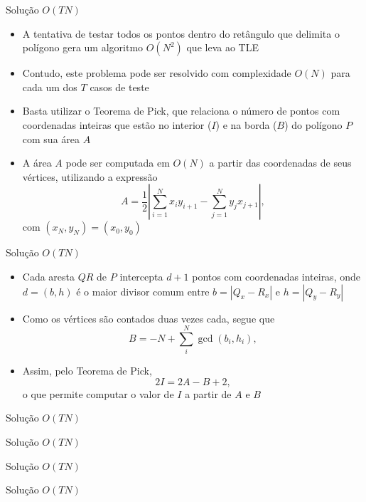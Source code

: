 \begin{frame}[fragile]{Solução $O(TN)$}

    \begin{itemize}
        \item A tentativa de testar todos os pontos dentro do retângulo que delimita o
            polígono gera um algoritmo $O(N^2)$ que leva ao TLE

        \item Contudo, este problema pode ser resolvido com complexidade $O(N)$ para cada um dos
            $T$ casos de teste

        \item Basta utilizar o Teorema de Pick, que relaciona o número de pontos com coordenadas
            inteiras que estão no interior ($I$) e na borda ($B$) do polígono $P$ com sua
            área $A$

        \item A área $A$ pode ser computada em $O(N)$ a partir das coordenadas de seus vértices,
            utilizando a expressão
        \[
            A = \frac{1}{2}\left|\sum_{i = 1}^{N} x_iy_{i + 1} -
            \sum_{j = 1}^{N} y_jx_{j + 1}\right|,
        \]
        com $(x_N, y_N) = (x_0, y_0)$

   \end{itemize}

\end{frame}

\begin{frame}[fragile]{Solução $O(TN)$}

    \begin{itemize}
        \item Cada aresta $QR$ de $P$ intercepta $d + 1$ pontos com coordenadas inteiras,
            onde $d = (b, h)$ é o maior divisor comum entre $b = |Q_x - R_x|$ e $h = |Q_y - R_y|$

        \item Como os vértices são contados duas vezes cada, segue que
        \[
            B = -N + \sum_i^N \gcd(b_i, h_i),
        \]
        
        \item Assim, pelo Teorema de Pick,
        \[
            2I = 2A - B + 2,
        \]
        o que permite computar o valor de $I$ a partir de $A$ e $B$
    \end{itemize}

\end{frame}

\begin{frame}[fragile]{Solução $O(TN)$}
\end{frame}

\begin{frame}[fragile]{Solução $O(TN)$}
\end{frame}

\begin{frame}[fragile]{Solução $O(TN)$}
\end{frame}

\begin{frame}[fragile]{Solução $O(TN)$}
\end{frame}
